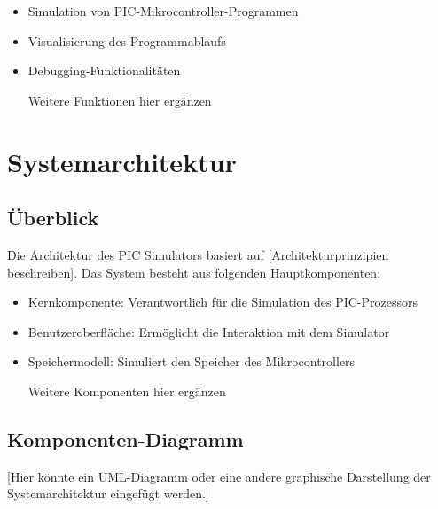 \documentclass[a4paper,11pt]{report}
\begin{document}
\begin{itemize}
    \item Simulation von PIC-Mikrocontroller-Programmen
    \item Visualisierung des Programmablaufs
    \item Debugging-Funktionalitäten
    \item [Weitere Funktionen hier ergänzen]
\end{itemize}

\chapter{Systemarchitektur}

\section{Überblick}
Die Architektur des PIC Simulators basiert auf [Architekturprinzipien beschreiben]. Das System besteht aus folgenden Hauptkomponenten:

\begin{itemize}
    \item Kernkomponente: Verantwortlich für die Simulation des PIC-Prozessors
    \item Benutzeroberfläche: Ermöglicht die Interaktion mit dem Simulator
    \item Speichermodell: Simuliert den Speicher des Mikrocontrollers
    \item [Weitere Komponenten hier ergänzen]
\end{itemize}

\section{Komponenten-Diagramm}
[Hier könnte ein UML-Diagramm oder eine andere graphische Darstellung der Systemarchitektur eingefügt werden.]
\end{document}
